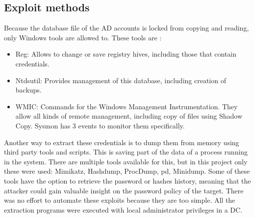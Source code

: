 \subsection{Exploit methods}
Because the database file of the AD accounts is locked from copying and reading, only Windows tools are allowed to. These tools are \cite{dump_ways}:
\begin{itemize}
	\item Reg: Allows to change or save registry hives, including those that contain credentials.
	\item Ntdsutil: Provides management of this database, including creation of backups.
	\item WMIC: Commands for the Windows Management Instrumentation. They allow all kinds of remote management, including copy of files using Shadow Copy. Sysmon has 3 events to monitor them specifically.
\end{itemize}
Another way to extract these credentials is to dump them from memory using third party tools and scripts. This is saving part of the data of a process running in the system\cite{dump_ways}.
There are multiple tools available for this, but in this project only these were used: Mimikatz, Hashdump, ProcDump, pd, Minidump.
\linej
Some of these tools have the option to retrieve the password or hashes history, meaning that the attacker could gain valuable insight on the password policy of the target.
\linej
\linej
There was no effort to automate these exploits because they are too simple.
All the extraction programs were executed with local administrator privileges in a DC.

